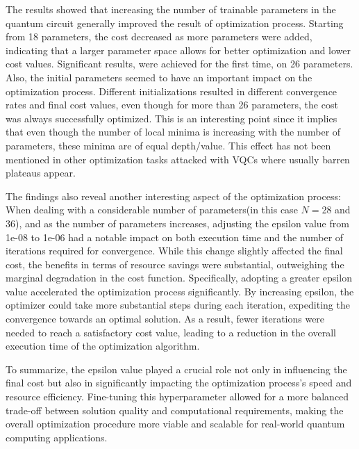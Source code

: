 \documentclass[inscr,ack,preface]{diphdthesis}
\begin{document}
The results showed that increasing the number of trainable parameters in the quantum circuit generally improved the result of optimization process. Starting from 18 parameters, the cost decreased as more parameters were added, indicating that a larger parameter space allows for better optimization and lower cost values. Significant results, were achieved for the first time, on 26 parameters. Also, the initial parameters seemed to have an important impact on the optimization process. Different initializations resulted in different convergence rates and final cost values, even though for more than 26 parameters, the cost was always successfully optimized. This is an interesting point since it implies that even though the number of local minima is increasing with the number of parameters, these minima are of equal depth/value. This effect has not been mentioned in other optimization tasks attacked with VQCs where usually barren plateaus appear.

The findings also reveal another interesting aspect of the optimization process: When dealing with a considerable number of parameters(in this case $N=$28 and 36), and as the number of parameters increases, adjusting the epsilon value from 1e-08 to 1e-06 had a notable impact on both execution time and the number of iterations required for convergence. 
While this change slightly affected the final cost, the benefits in terms of resource savings were substantial, outweighing the marginal degradation in the cost function. Specifically, adopting a greater epsilon value accelerated the optimization process significantly. By increasing epsilon, the optimizer could take more substantial steps during each iteration, expediting the convergence towards an optimal solution. As a result, fewer iterations were needed to reach a satisfactory cost value, leading to a reduction in the overall execution time of the optimization algorithm.


To summarize,  the epsilon value played a crucial role not only in influencing the final cost but also in significantly impacting the optimization process's speed and resource efficiency. Fine-tuning this hyperparameter allowed for a more balanced trade-off between solution quality and computational requirements, making the overall optimization procedure more viable and scalable for real-world quantum computing applications. 
\end{document}
